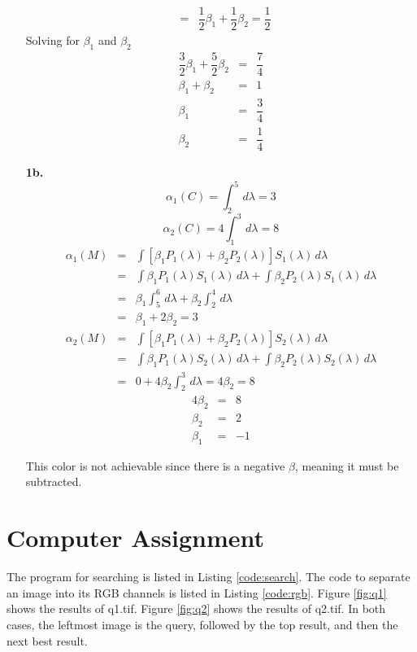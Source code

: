 \documentclass[10pt, a4paper]{article}
\begin{document}
\begin{enumerate}
\begin{eqnarray}
      &=& \dfrac{1}{2}\beta_1 + \dfrac{1}{2}\beta_2 = \dfrac{1}{2}
    \end{eqnarray}
    Solving for $\beta_1$ and $\beta_2$
    \begin{eqnarray}
      \dfrac{3}{2}\beta_1 + \dfrac{5}{2}\beta_2 &=& \dfrac{7}{4} \\  
      \beta_1 + \beta_2 &=& 1 \\
      \beta_1 &=& \dfrac{3}{4} \\
      \beta_2 &=& \dfrac{1}{4}
    \end{eqnarray}
  \item[\textbf{1b. }]
    \begin{equation}
      \alpha_1(C) = \int^5_2\, d\lambda = 3
    \end{equation}
    \begin{equation}
      \alpha_2(C) = 4\int^3_1\, d\lambda = 8
    \end{equation}
    \begin{eqnarray}
      \alpha_1(M) &=& \int \left[\beta_1 P_1(\lambda) + \beta_2 P_2(\lambda)\right]S_1(\lambda)\, d\lambda \\
      &=& \int \beta_1 P_1(\lambda) S_1(\lambda)\, d\lambda + \int \beta_2 P_2(\lambda) S_1(\lambda)\, d\lambda \\
      &=& \beta_1 \int^6_5\, d\lambda + \beta_2 \int^4_2\, d\lambda \\
      &=& \beta_1 + 2\beta_2 = 3
    \end{eqnarray}
    \begin{eqnarray}
      \alpha_2(M) &=& \int \left[\beta_1 P_1(\lambda) + \beta_2 P_2(\lambda)\right]S_2(\lambda)\, d\lambda \\
      &=& \int \beta_1 P_1(\lambda) S_2(\lambda)\, d\lambda + \int \beta_2 P_2(\lambda) S_2(\lambda)\, d\lambda \\
      &=& 0 + 4\beta_2\int^3_2\, d\lambda = 4\beta_2 = 8
    \end{eqnarray}
    \begin{eqnarray}
      4\beta_2 &=& 8 \\
      \beta_2 &=& 2 \\
      \beta_1 &=& -1
    \end{eqnarray}

    This color is not achievable since there is a negative $\beta$, meaning it must be subtracted.

\end{enumerate}

\section{Computer Assignment}
The program for searching is listed in Listing \ref{code:search}. The code to separate an image into
its RGB channels is listed in Listing \ref{code:rgb}. Figure \ref{fig:q1} shows the results of q1.tif.
Figure \ref{fig:q2} shows the results of q2.tif. In both cases, the leftmost image is the query, followed
by the top result, and then the next best result.
\end{document}
